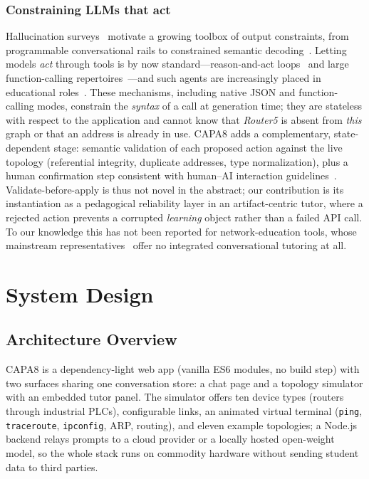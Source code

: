 \documentclass[conference,a4paper]{IEEEtran}
\begin{document}
\subsubsection*{Constraining LLMs that act}
Hallucination surveys~\cite{ji2023survey} motivate a growing toolbox of output constraints, from programmable conversational rails to constrained semantic decoding~\cite{rebedea2023nemo}. Letting models \emph{act} through tools is by now standard---reason-and-act loops~\cite{yao2023react} and large function-calling repertoires~\cite{qin2023toolllm}---and such agents are increasingly placed in educational roles~\cite{jin2024teachable}. These mechanisms, including native JSON and function-calling modes, constrain the \emph{syntax} of a call at generation time; they are stateless with respect to the application and cannot know that \emph{Router5} is absent from \emph{this} graph or that an address is already in use. CAPA8 adds a complementary, state-dependent stage: semantic validation of each proposed action against the live topology (referential integrity, duplicate addresses, type normalization), plus a human confirmation step consistent with human--AI interaction guidelines~\cite{amershi2019guidelines}. Validate-before-apply is thus not novel in the abstract; our contribution is its instantiation as a pedagogical reliability layer in an artifact-centric tutor, where a rejected action prevents a corrupted \emph{learning} object rather than a failed API call. To our knowledge this has not been reported for network-education tools, whose mainstream representatives~\cite{packettracer,lantz2010mininet} offer no integrated conversational tutoring at all.

\section{System Design}
\subsection{Architecture Overview}
CAPA8 is a dependency-light web app (vanilla ES6 modules, no build step) with two surfaces sharing one conversation store: a chat page and a topology simulator with an embedded tutor panel. The simulator offers ten device types (routers through industrial PLCs), configurable links, an animated virtual terminal (\texttt{ping}, \texttt{traceroute}, \texttt{ipconfig}, ARP, routing), and eleven example topologies; a Node.js backend relays prompts to a cloud provider or a locally hosted open-weight model, so the whole stack runs on commodity hardware without sending student data to third parties.
\end{document}
